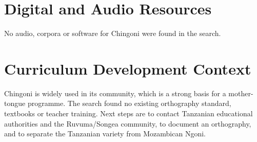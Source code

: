 \documentclass[12pt]{article}
\begin{document}
\section{Digital and Audio Resources}
No audio, corpora or software for Chingoni were found in the search.

\section{Curriculum Development Context}
Chingoni is widely used in its community, which is a strong basis for a mother-tongue programme. The search found no existing orthography standard, textbooks or teacher training. Next steps are to contact Tanzanian educational authorities and the Ruvuma/Songea community, to document an orthography, and to separate the Tanzanian variety from Mozambican Ngoni.
\end{document}
